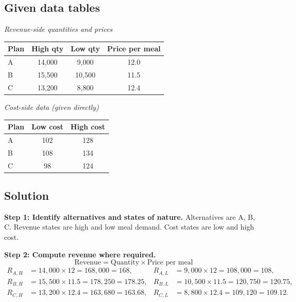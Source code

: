 \begin{ExamProblems}
		\subsection*{Given data tables}
		\begin{center}
			\begin{minipage}[t]{0.48\linewidth}
				\textit{Revenue-side quantities and prices}
				\begin{center}
					\begin{tabular}{l c c c}
						\toprule
						Plan & High qty & Low qty & Price per meal \\
						\midrule
						A & 14{,}000 & 9{,}000 & 12.0 \\
						B & 15{,}500 & 10{,}500 & 11.5 \\
						C & 13{,}200 & 8{,}800 & 12.4 \\
						\bottomrule
					\end{tabular}
				\end{center}
			\end{minipage}
			\hfill
			\begin{minipage}[t]{0.48\linewidth}
				\textit{Cost-side data (given directly)}
				\begin{center}
					\begin{tabular}{l c c}
						\toprule
						Plan & Low cost & High cost \\
						\midrule
						A & 102 & 128 \\
						B & 108 & 134 \\
						C & 98 & 124 \\
						\bottomrule
					\end{tabular}
				\end{center}
			\end{minipage}
		\end{center}
		
		\subsection*{Solution}
		\textbf{Step 1: Identify alternatives and states of nature.} Alternatives are A, B, C. Revenue states are high and low meal demand. Cost states are low and high cost.
		
		\textbf{Step 2: Compute revenue where required.}
		\[
		\text{Revenue} = \text{Quantity} \times \text{Price per meal}
		\]
		\[
		\begin{aligned}
		R_{A,H} &= 14{,}000\times12 = 168{,}000 = 168, & R_{A,L} &= 9{,}000\times12 = 108{,}000 = 108,\\
		R_{B,H} &= 15{,}500\times11.5 = 178{,}250 = 178.25, & R_{B,L} &= 10{,}500\times11.5 = 120{,}750 = 120.75,\\
		R_{C,H} &= 13{,}200\times12.4 = 163{,}680 = 163.68, & R_{C,L} &= 8{,}800\times12.4 = 109{,}120 = 109.12.
		\end{aligned}
		\]
		

\end{ExamProblems}
